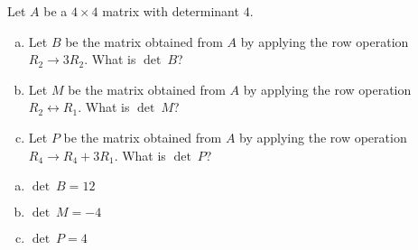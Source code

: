 
\begin{exerciseStatement}


Let \(A\) be a \(4 \times 4\) matrix with determinant \( 4 \).


\begin{enumerate}[(a)]
\item Let \(B\) be the matrix obtained from \(A\) by applying the row operation \( R_2 \to 3R_2 \). What is \(\operatorname{det}\ B\)?
\item Let \(M\) be the matrix obtained from \(A\) by applying the row operation \( R_2 \leftrightarrow R_1 \). What is \(\operatorname{det}\ M\)?
\item Let \(P\) be the matrix obtained from \(A\) by applying the row operation \( R_4 \to R_4 + 3R_1 \). What is \(\operatorname{det}\ P\)?
\end{enumerate}
    
\end{exerciseStatement}
    
\begin{exerciseAnswer} 

\begin{enumerate}[(a)]
\item \(\operatorname{det}\ B= 12 \)
\item \(\operatorname{det}\ M= -4 \)
\item \(\operatorname{det}\ P= 4 \)
\end{enumerate}
    
\end{exerciseAnswer}
    
